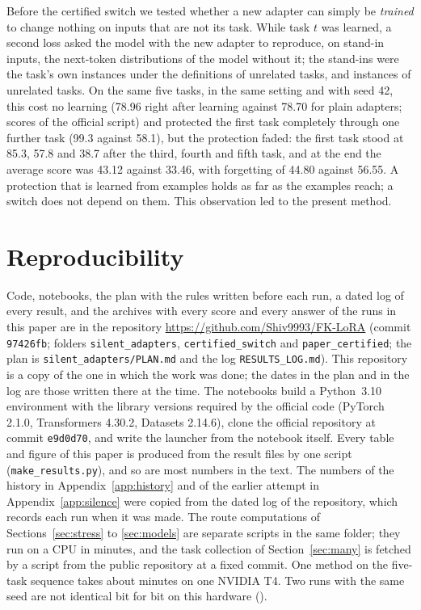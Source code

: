 Before the certified switch we tested whether a new adapter can simply be \emph{trained} to change
nothing on inputs that are not its task. While task $t$ was learned, a second loss asked the model
with the new adapter to reproduce, on stand-in inputs, the next-token distributions of the model
without it; the stand-ins were the task's own instances under the definitions of unrelated tasks,
and instances of unrelated tasks. On the same five tasks, in the same setting and with seed 42,
this cost no learning (78.96 right after learning against 78.70 for plain adapters; scores of the official script) and protected
the first task completely through one further task (99.3 against 58.1), but the protection faded:
the first task stood at 85.3, 57.8 and 38.7 after the third, fourth and fifth task, and at the end
the average score was 43.12 against 33.46, with forgetting of 44.80 against 56.55. A protection that
is learned from examples holds as far as the examples reach; a switch does not depend on them. This
observation led to the present method.

\FloatBarrier
\section{Reproducibility}
\label{app:repro}

Code, notebooks, the plan with the rules written before each run, a dated log of every result, and
the archives with every score and every answer of the runs in this paper are in the repository
\url{https://github.com/Shiv9993/FK-LoRA} (commit \texttt{97426fb}; folders
\texttt{silent\_adapters}, \texttt{certified\_switch} and \texttt{paper\_certified}; the plan is
\texttt{silent\_adapters/PLAN.md} and the log \texttt{RESULTS\_LOG.md}). This repository is a copy of the one
in which the work was done; the dates in the plan and in the log are those written there at the time. The notebooks
build a Python~3.10 environment with the library versions required by the official code
(PyTorch 2.1.0, Transformers 4.30.2, Datasets 2.14.6), clone the official repository at commit
\texttt{e9d0d70}, and write the launcher from the notebook itself. Every table and figure of this
paper is produced from the result files by one script (\texttt{make\_results.py}), and so are most
numbers in the text. The numbers of the history in Appendix~\ref{app:history} and of the earlier
attempt in Appendix~\ref{app:silence} were copied from the dated log of the repository, which
records each run when it was made. The route computations
of Sections~\ref{sec:stress} to \ref{sec:models} are separate scripts in the same folder; they run
on a CPU in minutes, and the task collection of Section~\ref{sec:many} is fetched by a script from
the public repository at a fixed commit. One method on the five-task sequence takes about
\FiveCertMinutes{} minutes on one NVIDIA T4. Two runs with the same seed are not identical bit for
bit on this hardware (\fivefull{}).
